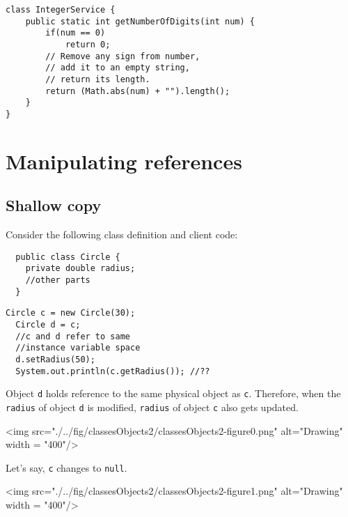 \begin{lstlisting}[basicstyle=\footnotesize]
class IntegerService {
	public static int getNumberOfDigits(int num) {
		if(num == 0)
			return 0;
		// Remove any sign from number, 
		// add it to an empty string, 
		// return its length.
		return (Math.abs(num) + "").length();
	}
}
\end{lstlisting}

\section{Manipulating references}

\subsection{Shallow copy}
  Consider the following class definition and client code:
  
  \begin{lstlisting}
  public class Circle {
  	private double radius;
  	//other parts
  }
  \end{lstlisting}    
  
  \begin{lstlisting}[style=correct,basicstyle=\footnotesize]
  Circle c = new Circle(30);
  Circle d = c; 
  //c and d refer to same
  //instance variable space
  d.setRadius(50);
  System.out.println(c.getRadius()); //??
  \end{lstlisting}    

  Object \texttt{d} holds reference to the same physical object as \texttt{c}. Therefore, when the \texttt{radius} of object \texttt{d} is modified, \texttt{radius} of object \texttt{c} also gets updated.


\begin{center}
<img src="./../fig/classesObjects2/classesObjects2-figure0.png" alt="Drawing" width = "400"/>
\end{center}

Let's say, \texttt{c} changes to \texttt{null}.

\begin{center}
<img src="./../fig/classesObjects2/classesObjects2-figure1.png" alt="Drawing" width = "400"/>
\end{center}
  
